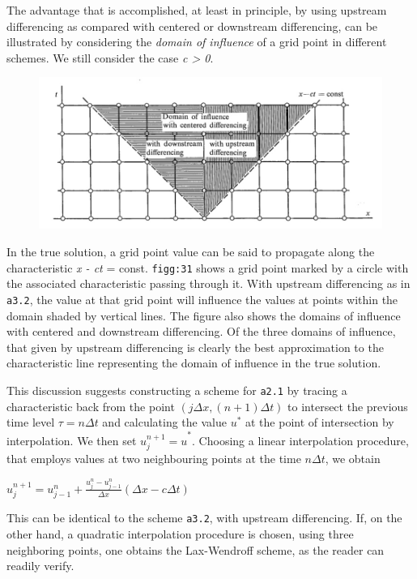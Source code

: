 The advantage that is accomplished, at least in principle, by using
upstream differencing as compared with centered or downstream
differencing, can be illustrated by considering the \emph{domain of
influence} of a grid point in different schemes. We still consider the
case \emph{c \textgreater{} 0}.

\begin{figure}
 \centering
 \includegraphics[width = .7 \textwidth]{figs/NM/pic31.jpg}
 \caption{} \label{fig:}
\end{figure}

In the true solution, a grid point value can be said to propagate along
the characteristic \emph{x - ct} = const. \texttt{figg:31} shows a grid
point marked by a circle with the associated characteristic passing
through it. With upstream differencing as in \texttt{a3.2}, the value at
that grid point will influence the values at points within the domain
shaded by vertical lines. The figure also shows the domains of influence
with centered and downstream differencing. Of the three domains of
influence, that given by upstream differencing is clearly the best
approximation to the characteristic line representing the domain of
influence in the true solution.

This discussion suggests constructing a scheme for \texttt{a2.1} by
tracing a characteristic back from the point
\(\left( j\Delta x,\left( n + 1 \right)\Delta t \right)\) to intersect
the previous time level \(\tau = n\Delta t\) and calculating the value
\(u^{*}\) at the point of intersection by interpolation. We then set
\({u_{j}^{n + 1} = u}^{*}\). Choosing a linear interpolation procedure,
that employs values at two neighbouring points at the time
\(n\Delta t\), we obtain

\(u_{j}^{n + 1} = u_{j - 1}^{n} + \frac{u_{j}^{n} - u_{j - 1}^{n}}{\Delta x}\left( \Delta x - c\Delta t \right)\)

This can be identical to the scheme \texttt{a3.2}, with upstream
differencing. If, on the other hand, a quadratic interpolation procedure
is chosen, using three neighboring points, one obtains the Lax-Wendroff
scheme, as the reader can readily verify.

